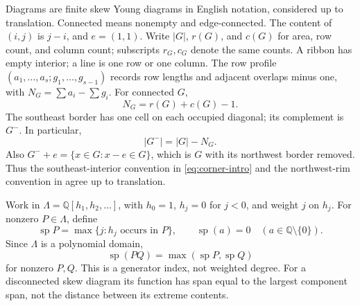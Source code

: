 \documentclass[11pt,a4paper]{amsart}
\numberwithin{equation}{section}
\theoremstyle{plain}
\theoremstyle{definition}
\begin{document}
Diagrams are finite skew Young diagrams in English notation, considered up to translation.  Connected means nonempty and edge-connected.  The content of \((i,j)\) is \(j-i\), and \(e=(1,1)\).  Write \(|G|\), \(r(G)\), and \(c(G)\) for area, row count, and column count; subscripts \(r_G,c_G\) denote the same counts.  A ribbon has empty interior; a line is one row or one column.  The row profile \((a_1,\ldots,a_s;g_1,\ldots,g_{s-1})\) records row lengths and adjacent overlaps minus one, with \(N_G=\sum a_i-\sum g_i\).  For connected \(G\),
\begin{equation*}
 N_G=r(G)+c(G)-1.
\end{equation*}
The southeast border has one cell on each occupied diagonal; its complement is \(G^-\).  In particular,
\begin{equation*}
 |G^-|=|G|-N_G.
\end{equation*}
Also \(G^-+e=\{x\in G:x-e\in G\}\), which is \(G\) with its northwest border removed.  Thus the southeast-interior convention in \eqref{eq:corner-intro} and the northwest-rim convention in \cite[p.~1656]{Barekat2009CoincidencesCorrigendum} agree up to translation.

Work in \(\Lambda=\mathbb Q[h_1,h_2,\ldots]\), with \(h_0=1\), \(h_j=0\) for \(j<0\), and weight \(j\) on \(h_j\).  For nonzero \(P\in\Lambda\), define
\begin{equation}\label{eq:polynomial-span}
 \operatorname{sp}P=\max\{j:h_j\text{ occurs in }P\},\qquad
 \operatorname{sp}(a)=0\quad(a\in\mathbb Q\setminus\{0\}).
\end{equation}
Since \(\Lambda\) is a polynomial domain,
\begin{equation}\label{eq:product-span}
 \operatorname{sp}(PQ)=\max(\operatorname{sp}P,\operatorname{sp}Q)
\end{equation}
for nonzero \(P,Q\).  This is a generator index, not weighted degree.  For a disconnected skew diagram its function has span equal to the largest component span, not the distance between its extreme contents.
\end{document}
